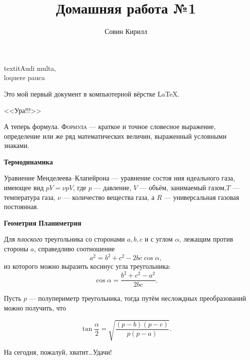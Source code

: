\documentclass[12pt]{article}
\title{Домашняя работа №1}
\author{Совин Кирилл}
\date{}
\begin{document}
	\maketitle
\begin{flushright}
textit{Audi multa,\\
	loquere pauca}	
\end{flushright}

\vspace{20pt}

Это мой первый документ в компьютерной вёрстке \LaTeX.

\begin{center}
\huge{<<Ура!!!>>}\\  %
\end{center}

\par А теперь формула. \textsc{Формула} --- краткое и точное словесное выражение, определение или же ряд математических величин, выраженный условными знаками.
\vspace{15pt}

\hspace{28pt}  \Large{\textbf{Термодинамика}} \normalsize{} %
\par Уравнение Менделеева--Клапейрона --- уравнение состоя
ния идеального газа, имеющее вид $pV = \nu pV$, где $p$ --- давление, $V$ --- объём, занимаемый газом,$T$ --- температура газа, $\nu$ --- количество вещества газа, а $R$ --- универсальная газовая постоянная.
\vspace{15pt}

\hspace{28pt}  {\Large\textbf{Геометрия}} \hfill {\Large\textbf{Планиметрия}} %

\par Для \textit{плоского} треугольника со сторонами $a, b, c$ и с углом $\alpha$, лежащим против стороны $a$, справедливо соотношение
$$
a^2 = b^2 + c^2 - 2bc \cos \alpha,
$$
из которого можно выразить косинус угла треугольника:
$$
\cos \alpha =\frac {b^2 + c^2 - a^2} {2bc}.
$$

Пусть $p$ --- полупериметр треугольника, тогда путём неслождных преобразований можно получить, что

$$
\tan \frac \alpha 2 = \sqrt{\frac {(p-b)(p -c)} {p(p-a)} }.
$$

\begin{flushleft} %
На сегодня, пожалуй, хватит\dots Удачи!
\end{flushleft}
\end{document}

